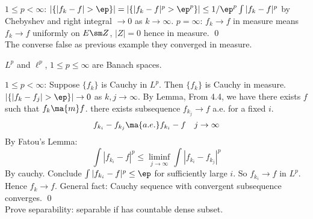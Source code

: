 \pf $1 \leq p <\infty$: $|\{|f_k-f|>\ep\}|= |\{|f_k-f|^p>\ep^p\}| \leq 1/\ep^p \int |f_k-f|^p$ by Chebyshev and right integral $\to 0$ as $k \to \infty$. $p=\infty$: $f_k \to f$ in measure means $f_k \to f$ uniformly on $E\sm Z$, $|Z|=0$ hence in measure. \qed \\


The converse false as previous example they converged in measure.


\begin{thm} 
$L^p$ and $\ell^p$, $1 \leq p \leq \infty$ are Banach spaces.
\end{thm}


$1 \leq p<\infty$: Suppose $\{f_k\}$ is Cauchy in $L^p$. Then $\{f_k\}$ is Cauchy in measure. $|\{ |f_k-f_j|>\ep\}| \to 0$ as $k,j \to \infty$. By Lemma, From 4.4, we have there exists $f$ such that $f_k \ma{m} f$. there exists subsequence $f_{k_j} \to f$ a.e. for a fixed $i$.
	\[
	f_{k_i} - f_{k_j} \ma{a.e.} f_{k_i} - f \quad j \to \infty
	\]
By Fatou's Lemma: 
	\[
	\int |f_{k_i}-f|^p \leq \liminf_{j \to \infty} \int |f_{k_i} - f_{k_j}|^p
	\]
By cauchy. Conclude $\int |f_{k_i} - f|^p \leq \ep$ for sufficiently large $i$. So $f_{k_i} \to f$ in $L^p$. Hence $f_k \to f$. General fact: Cauchy sequence with convergent subsequence converges. \qed \\



Prove separability: separable if has countable dense subset. 

